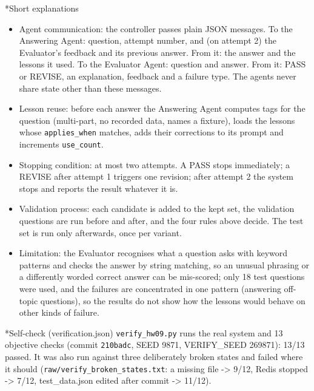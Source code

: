 \documentclass[11pt]{article}
\makeatletter
\renewcommand\section{\@startsection{section}{1}{\z@}{-3.0ex \@plus -1ex \@minus -.2ex}{1.2ex \@plus.2ex}{\normalfont\fontsize{14}{17}\selectfont\bfseries}}
\renewcommand\subsection{\@startsection{subsection}{2}{\z@}{-2.2ex \@plus -1ex \@minus -.2ex}{0.8ex \@plus.2ex}{\normalfont\fontsize{12}{14.5}\selectfont\bfseries}}
\makeatother
\begin{document}
\subsection*{Short explanations}
\begin{itemize}\setlength\itemsep{2pt}
\item Agent communication: the controller passes plain JSON messages. To the Answering Agent: question, attempt number, and (on attempt 2) the Evaluator's feedback and its previous answer. From it: the answer and the lessons it used. To the Evaluator Agent: question and answer. From it: PASS or REVISE, an explanation, feedback and a failure type. The agents never share state other than these messages.
\item Lesson reuse: before each answer the Answering Agent computes tags for the question (multi-part, no recorded data, names a fixture), loads the lessons whose \texttt{applies\_\allowbreak{}when} matches, adds their corrections to its prompt and increments \texttt{use\_\allowbreak{}count}.
\item Stopping condition: at most two attempts. A PASS stops immediately; a REVISE after attempt 1 triggers one revision; after attempt 2 the system stops and reports the result whatever it is.
\item Validation process: each candidate is added to the kept set, the validation questions are run before and after, and the four rules above decide. The test set is run only afterwards, once per variant.
\item Limitation: the Evaluator recognises what a question asks with keyword patterns and checks the answer by string matching, so an unusual phrasing or a differently worded correct answer can be mis-scored; only 18 test questions were used, and the failures are concentrated in one pattern (answering off-topic questions), so the results do not show how the lessons would behave on other kinds of failure.
\end{itemize}
\section*{Self-check (verification.json)}
\texttt{verify\_\allowbreak{}hw09.py} runs the real system and 13 objective checks (commit \texttt{210badc}, SEED 9871, VERIFY\_\allowbreak{}SEED 269871): 13/13 passed. It was also run against three deliberately broken states and failed where it should (\texttt{raw/\allowbreak{}verify\_\allowbreak{}broken\_\allowbreak{}states.txt}: a missing file -> 9/12, Redis stopped -> 7/12, test\_\allowbreak{}data.json edited after commit -> 11/12).
\end{document}
